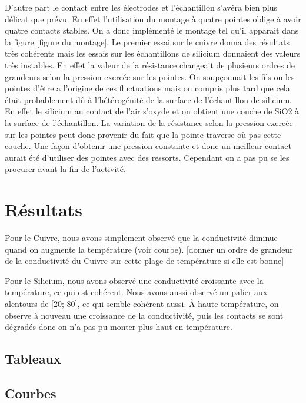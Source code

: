 D'autre part le contact entre les électrodes et l'échantillon s'avéra bien plus délicat que prévu. 
En effet l'utilisation du montage à quatre pointes oblige à avoir quatre contacts stables. On a donc implémenté 
le montage tel qu'il apparait dans la figure [figure du montage]. Le premier essai sur le cuivre donna des résultats 
très cohérents mais les essais sur les échantillons de silicium donnaient des valeurs très instables. 
En effet la valeur de la résistance changeait de plusieurs ordres de grandeurs selon la pression exercée sur les 
pointes. On soupçonnait les fils ou les pointes d'être a l'origine de ces fluctuations 
mais on compris plus tard que cela était probablement dû à l'hétérogénité de la surface de l'échantillon de silicium. 
En effet le silicium au contact de l'air s'oxyde et on obtient une couche de SiO2 à la surface de l'échantillon. 
La variation de la résistance selon la pression exercée sur les pointes peut donc provenir du fait que la pointe 
traverse où pas cette couche. Une façon d'obtenir une pression constante et donc un meilleur contact aurait été d'utiliser des pointes avec des ressorts. Cependant on a pas pu se les procurer avant la fin de l'activité. 


\section*{Résultats}
Pour le Cuivre, nous avons simplement observé que la conductivité diminue quand on augmente la température (voir courbe).
[donner un ordre de grandeur de la conductivité du Cuivre sur cette plage de température si elle est bonne]


Pour le Silicium, nous avons observé une conductivité croissante avec la température, ce qui est cohérent. Nous avons aussi observé un palier aux alentours de [20\celsius; 80\celsius], ce qui semble cohérent aussi.
À haute température, on observe à nouveau une croissance de la conductivité, 
puis les contacts se sont dégradés donc on n'a pas pu monter plus haut en température.


\subsection*{Tableaux}

\subsection*{Courbes}


